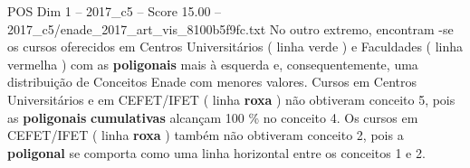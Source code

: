 \begin{textsample}{POS Dim 1 – 2017\_c5 – Score 15.00 – 2017\_c5/enade\_2017\_art\_vis\_8100b5f9fc.txt}
No outro extremo, encontram -se os cursos oferecidos em Centros Universitários ( linha verde ) e Faculdades ( linha vermelha ) com as \textbf{poligonais} mais à esquerda e, consequentemente, uma distribuição de Conceitos Enade com menores valores.
Cursos em Centros Universitários e em CEFET/IFET ( linha \textbf{roxa} ) não obtiveram conceito 5, pois as \textbf{poligonais} \textbf{cumulativas} alcançam 100 \% no conceito 4.
Os cursos em CEFET/IFET ( linha \textbf{roxa} ) também não obtiveram conceito 2, pois a \textbf{poligonal} se comporta como uma linha horizontal entre os conceitos 1 e 2.

\end{textsample}

